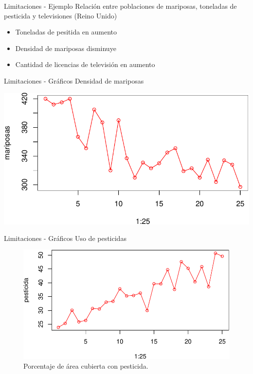 \documentclass[
  11pt,
  ignorenonframetext,
]{beamer}
\begin{document}
\begin{frame}{Limitaciones - Ejemplo}
\protect\hypertarget{limitaciones---ejemplo}{}
Relación entre poblaciones de mariposas, toneladas de pesticida y
televisiones (Reino Unido)

\begin{itemize}
\item
  Toneladas de pesitida en aumento
\item
  Densidad de mariposas disminuye
\item
  Cantidad de licencias de televisión en aumento
\end{itemize}
\end{frame}

\begin{frame}{Limitaciones - Gráficos}
\protect\hypertarget{limitaciones---gruxe1ficos}{}
Densidad de mariposas

\includegraphics{Correlacion_files/figure-beamer/unnamed-chunk-8-1.pdf}
\end{frame}

\begin{frame}{Limitaciones - Gráficos}
\protect\hypertarget{limitaciones---gruxe1ficos-1}{}
Uso de pesticidas

\begin{figure}
\centering
\includegraphics{Correlacion_files/figure-beamer/unnamed-chunk-9-1.pdf}
\caption{Porcentaje de área cubierta con pesticida.}
\end{figure}
\end{frame}
\end{document}
